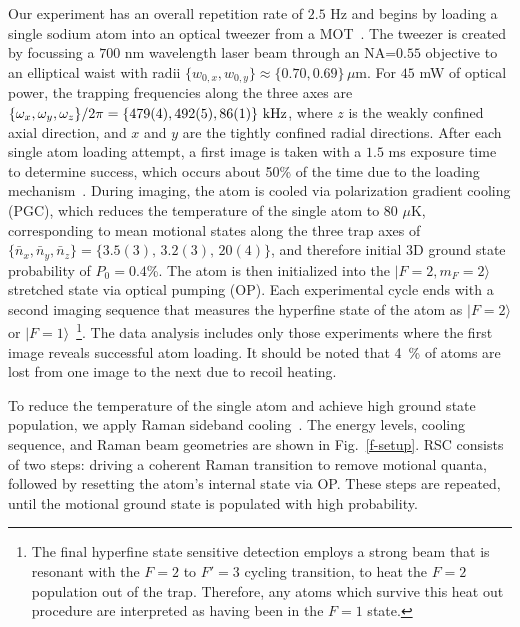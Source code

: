 \documentclass[aps,prl,twocolumn,groupedaddress]{revtex4-1}
\begin{document}
Our experiment has an overall repetition rate of $2.5$ Hz and
begins by loading a single sodium atom into an optical tweezer from a MOT~\cite{Hutzler2017-LightShifts}.
The tweezer is created by focussing a $700$ nm wavelength laser beam through an NA=$0.55$ objective to an elliptical waist with radii $\{w_{0,x},w_{0,y}\}\approx \{0.70,0.69\}\,\mu$m.
For $45$ mW of optical power, the trapping frequencies along the three axes are
$\{\omega_x,\omega_y,\omega_z\}/2\pi = \{479(4), 492(5), 86(1)\}\ \text{\text{kHz}}$,
where $z$ is the weakly confined axial direction,
and $x$ and $y$ are the tightly confined radial directions.
After each single atom loading attempt, a first image is taken with a $1.5$ ms exposure time
to determine success, which occurs about 50\% of the time due to the loading mechanism~\cite{Schlosser2001}.
During imaging, the atom is cooled via polarization gradient cooling (PGC),
which reduces the temperature of the single atom to $80$ $\mu$K,
corresponding to mean motional states along the three trap axes of
$\{\bar n_x, \bar n_y, \bar n_z\}=\{3.5(3),\, 3.2(3),\, 20(4)\}$, and therefore initial 3D ground state probability of $P_0=0.4$\%.
The atom is then initialized into
the $|F=2, m_F=2\rangle$ stretched state via optical pumping (OP).
Each experimental cycle ends with a second imaging sequence that measures the hyperfine state of the atom as $|F=2\rangle$ or $|F=1\rangle$~\footnote{The final hyperfine state sensitive detection employs a strong beam that is resonant with the $F=2$ to $F'=3$ cycling transition, to heat the $F=2$ population out of the trap. Therefore, any atoms which survive this heat out procedure are interpreted as having been in the $F=1$ state.}. The data analysis includes only those experiments where the first image reveals successful atom loading.  It should be noted that 4~\% of atoms are lost from one image to the next due to recoil heating.

To reduce the temperature of the single atom and
 achieve high ground state population, we apply Raman sideband cooling~\cite{Monroe1995, Kaufman2012}.
The energy levels, cooling sequence, and Raman beam geometries
are shown in Fig.~\ref{f-setup}. RSC consists of two steps:
driving a coherent Raman transition to remove motional quanta, followed by resetting the atom's internal state via OP.
These steps are repeated, until the motional ground state is populated with high probability.
\end{document}
